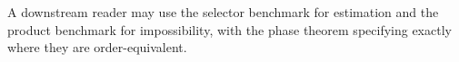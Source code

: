 A downstream reader may use the selector benchmark for estimation and the product benchmark for impossibility, with the phase theorem specifying exactly where they are order-equivalent.